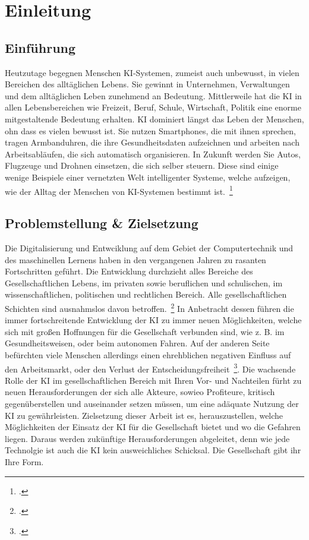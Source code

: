 \section{Einleitung}
\subsection{Einführung}
Heutzutage begegnen Menschen \ac{KI}-Systemen, zumeist auch unbewusst, in vielen Bereichen des alltäglichen Lebens. Sie gewinnt in Unternehmen, Verwaltungen und dem alltäglichen
Leben zunehmend an Bedeutung. 
Mittlerweile hat die \ac{KI} in allen Lebensbereichen wie Freizeit, Beruf, Schule, Wirtschaft, Politik eine enorme mitgestaltende Bedeutung erhalten. \ac{KI} dominiert 
längst das Leben der Menschen, ohn dass es vielen bewusst ist. Sie nutzen Smartphones, die mit ihnen sprechen, tragen Armbanduhren, die ihre Gesundheitsdaten aufzeichnen und arbeiten nach Arbeitsabläufen, die 
sich automatisch organisieren. In Zukunft werden Sie Autos, Flugzeuge und Drohnen einsetzen, die sich selber steuern. Diese sind einige wenige Beispiele einer vernetzten Welt intelligenter 
Systeme, welche aufzeigen, wie der Alltag der Menschen von \ac{KI}-Systemen bestimmt ist.~\footcite[\vglf][]{Mainer.2019}
\subsection{Problemstellung & Zielsetzung}
Die Digitalisierung und Entwciklung auf dem Gebiet der Computertechnik und des maschinellen Lernens haben in den vergangenen Jahren zu rasanten Fortschritten geführt. Die Entwicklung
durchzieht alles Bereiche des Gesellschaftlichen Lebens, im privaten sowie beruflichen und schulischen, im wissenschaftlichen, politischen und rechtlichen Bereich. Alle gesellschaftlichen
Schichten sind ausnahmslos davon betroffen.~\footcite[\vglf][]{Lenzen.2020}
In Anbetracht dessen führen die immer fortschreitende Entwicklung der KI zu immer neuen Möglichkeiten, welche sich mit großen Hoffnungen für die Gesellschaft verbunden sind, wie z. B. im Gesundheitsweisen, 
oder beim autonomen Fahren. 
Auf der anderen Seite befürchten viele Menschen allerdings einen ehrehblichen negativen Einfluss auf den Arbeitsmarkt, oder den Verlust der Entscheidungsfreiheit~\footcite[\vglf][]{Wittpahl.2018}.
Die wachsende Rolle der \ac{KI} im gesellschaftlichen Bereich mit Ihren Vor- und Nachteilen fürht zu neuen Herausforderungen der sich alle Akteure, sowieo Profiteure, kritisch 
gegenüberstellen und auseinander setzen müssen, um eine adäquate Nutzung der \ac{KI} zu gewährleisten. Zielsetzung dieser Arbeit ist es, herauszustellen, welche Möglichkeiten
der Einsatz der \ac{KI} für die Gesellschaft bietet und wo die Gefahren liegen. Daraus werden zukünftige Herausforderungen abgeleitet, denn wie jede Technolgie ist auch die \ac{KI}
kein ausweichliches Schicksal. Die Gesellschaft gibt ihr Ihre Form. 

